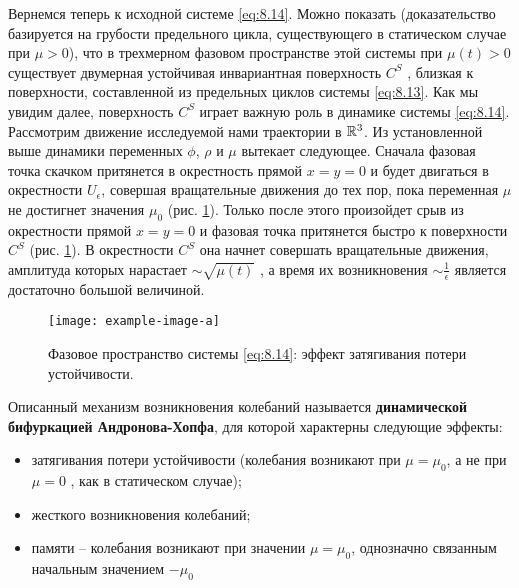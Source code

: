  Вернемся теперь к исходной системе \eqref{eq:8.14}. Можно показать
(доказательство базируется на грубости предельного цикла, существующего в
статическом случае при $\mu>0$), что в трехмерном фазовом пространстве этой
системы при $\mu(t)>0$ существует двумерная устойчивая инвариантная
поверхность $C^S$ , близкая к поверхности, составленной из предельных циклов
системы \eqref{eq:8.13}. Как мы увидим далее, поверхность $C^S$ играет важную роль в
динамике системы \eqref{eq:8.14}. Рассмотрим движение исследуемой нами траектории
в $\mathbb{R}^3$. Из установленной выше динамики переменных $\phi$, $\rho$ и $\mu$ вытекает
следующее. Сначала фазовая точка скачком притянется в окрестность прямой
$x=y=0$ и будет двигаться в окрестности $U_{\epsilon}$, совершая вращательные движения
до тех пор, пока переменная $\mu$ не достигнет значения $\mu_0$ (рис. \ref{fig:8.6}). Только после
этого произойдет срыв из окрестности прямой $x=y=0$ и фазовая точка
притянется быстро к поверхности $C^S$ (рис. \ref{fig:8.6}). В окрестности $C^S$ она начнет
совершать вращательные движения, амплитуда которых нарастает $\sim \sqrt{\mu(t)}$ , а
время их возникновения $\sim \frac{1}{\epsilon}$ является достаточно большой величиной. 
\begin{figure}[h]
        \centering
        \texttt{[image: example-image-a]}
        \caption{Фазовое пространство системы \eqref{eq:8.14}: эффект затягивания потери устойчивости.}
        \label{fig:8.6}
\end{figure}

Описанный механизм возникновения колебаний называется \textbf{динамической бифуркацией Андронова-Хопфа},
для которой характерны следующие эффекты:
\begin{itemize}
        \item затягивания потери устойчивости (колебания возникают при $\mu=\mu_0$, а не при $\mu=0$ 
                , как в статическом случае);
        \item жесткого возникновения колебаний;
        \item памяти -- колебания возникают при значении $\mu=\mu_0$, однозначно связанным начальным значением $-\mu_0$ 
\end{itemize}

